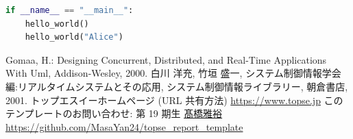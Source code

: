 \documentclass[a4paper,9pt]{extarticle}
\begin{document}
\begin{multicols}{2}
\begin{minipage}{0.95\linewidth}
\begin{lstlisting}[language=Python,caption={コードのキャプションはこちら.},label={code:helloworld}]
if __name__ == "__main__":
    hello_world()
    hello_world("Alice")
\end{lstlisting}
\end{minipage}


\begin{thebibliography}{99}
 Gomaa,  H.: Designing Concurrent,  Distributed,  and Real-Time Applications With Uml, Addison-Wesley, 2000.
 白川 洋充,  竹垣 盛一,  システム制御情報学会編:リアルタイムシステムとその応用,   システム制御情報ライブラリー, 朝倉書店,  2001.
 トップエスイーホームページ (URL 共有方法) \url{https://www.topse.jp}
 このテンプレートのお問い合わせ: 第 19 期生 \href{mailto:dr.masahiro.takahashi@gmail.com}{髙橋雅裕} \url{https://github.com/MasaYan24/topse_report_template}
\end{thebibliography}

\end{multicols}
\end{document}
